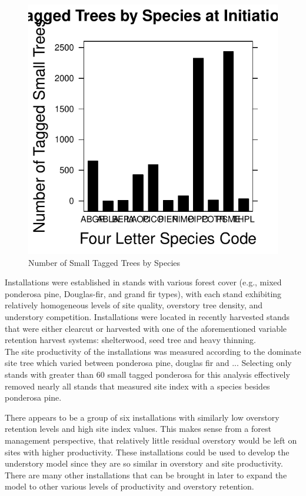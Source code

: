 \documentclass[11pt, letterpaper, fleqn]{article}
\begin{document}
\begin{figure}
\begin{center}
\includegraphics{Thesis_doc-species}
\end{center}
\caption{Number of Small Tagged Trees by Species}
\end{figure}


Installations were established in stands with various forest cover (e.g., mixed ponderosa pine, Douglas-fir, and grand fir types), with each stand exhibiting relatively homogeneous levels of site quality, overstory tree density, and understory competition.  Installations were located in recently harvested stands that were either clearcut or harvested with one of the aforementioned variable retention harvest systems: shelterwood, seed tree and heavy thinning. \\[2pt]


The site productivity of the installations was measured according to the dominate site tree which varied between ponderosa pine, douglas fir and ... Selecting only stands with greater than 60 small tagged ponderosa for this analysis effectively removed nearly all stands that measured site index with a species besides ponderosa pine.

There appears to be a group of six installations with similarly low overstory retention levels and high site index values.  This makes sense from a forest management perspective, that relatively little residual overstory would be left on sites with higher productivity.  These installations could be used to develop the understory model since they are so similar in overstory and site productivity. There are many other installations that can be brought in later to expand the model to other various levels of productivity and overstory retention.
\end{document}

